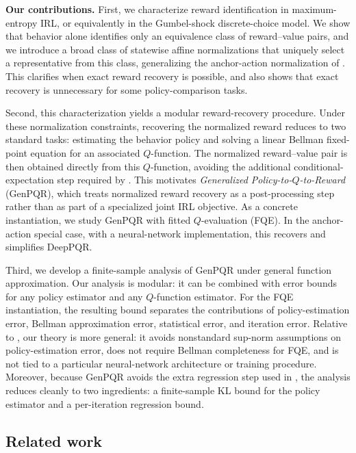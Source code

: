 \documentclass{article}
\newcommand{\1}{\mathbbm{1}}
\begin{document}
  
 

\textbf{Our contributions.}
First, we characterize reward identification in maximum-entropy IRL, or
equivalently in the Gumbel-shock discrete-choice model. We show that behavior
alone identifies only an equivalence class of reward--value pairs, and we
introduce a broad class of statewise affine normalizations that uniquely select
a representative from this class, generalizing the anchor-action normalization
of \citet{geng2020deep}. This clarifies when exact reward recovery is possible,
and also shows that exact recovery is unnecessary for some policy-comparison
tasks.

Second, this characterization yields a modular reward-recovery procedure.
Under these normalization constraints, recovering the normalized reward reduces
to two standard tasks: estimating the behavior policy and solving a linear
Bellman fixed-point equation for an associated \(Q\)-function. The normalized
reward--value pair is then obtained directly from this \(Q\)-function, avoiding
the additional conditional-expectation step required by
\citet{geng2020deep}. This motivates \emph{Generalized
Policy-to-\(Q\)-to-Reward} (GenPQR), which treats normalized reward
recovery as a post-processing step rather than as part of a specialized joint
IRL objective. As a concrete instantiation, we study GenPQR with fitted
\(Q\)-evaluation (FQE). In the anchor-action special case, with a neural-network
implementation, this recovers and simplifies DeepPQR.

Third, we develop a finite-sample analysis of GenPQR under general function
approximation. Our analysis is modular: it can be combined with error bounds
for any policy estimator and any \(Q\)-function estimator. For the FQE
instantiation, the resulting bound separates the contributions of
policy-estimation error, Bellman approximation error, statistical error, and
iteration error. Relative to \citet{geng2020deep}, our theory is more general:
it avoids nonstandard sup-norm assumptions on policy-estimation error, does not
require Bellman completeness for FQE, and is not tied to a particular
neural-network architecture or training procedure. Moreover, because GenPQR
avoids the extra regression step used in \citet{geng2020deep}, the analysis
reduces cleanly to two ingredients: a finite-sample KL bound for the policy
estimator and a per-iteration regression bound.

\subsection{Related work}
\end{document}
